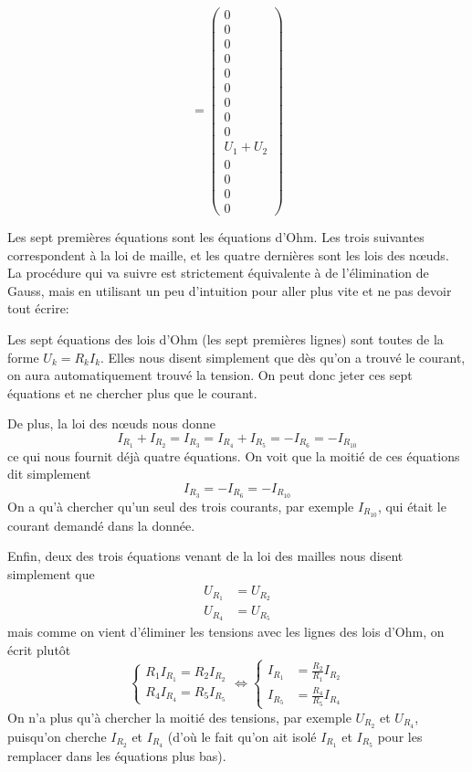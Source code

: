 \documentclass{article}
\begin{document}
\[=\begin{pmatrix}0\\0\\0\\0\\0\\0\\0\\0\\0\\U_1 + U_2\\0\\0\\0\\0\end{pmatrix}
\]

Les sept premières équations sont les équations d'Ohm. Les trois suivantes correspondent à la loi de maille, et les quatre dernières sont les lois des n\oe{}uds. La procédure qui va suivre est strictement équivalente à de l'élimination de Gauss, mais en utilisant un peu d'intuition pour aller plus vite et ne pas devoir tout écrire:

Les sept équations des lois d'Ohm (les sept premières lignes) sont toutes de la forme $U_k = R_k I_k$. Elles nous disent simplement que dès qu'on a trouvé le courant, on aura automatiquement trouvé la tension. On peut donc jeter ces sept équations et ne chercher plus que le courant.

De plus, la loi des n\oe{}uds nous donne
\[I_{R_1} + I_{R_2} = I_{R_3} = I_{R_4} + I_{R_5} = -I_{R_6} = -I_{R_{10}}\]
ce qui nous fournit déjà quatre équations. On voit que la moitié de ces équations dit simplement \[ I_{R_3}=-I_{R_6}=-I_{R_{10}}\] On a qu'à chercher qu'un seul des trois courants, par exemple $I_{R_{10}}$, qui était le courant demandé dans la donnée.

Enfin, deux des trois équations venant de la loi des mailles nous disent simplement que 
\begin{align*}
    U_{R_1}&=U_{R_2}\\
    U_{R_4}&=U_{R_5}
\end{align*}
mais comme on vient d'éliminer les tensions avec les lignes des lois d'Ohm, on écrit plutôt
\[
\left\{\begin{aligned}
    R_1I_{R_1}=R_2I_{R_2}\\
    R_4I_{R_4}=R_5I_{R_5}
\end{aligned}\right. \Leftrightarrow
\left\{\begin{aligned}
    I_{R_1} &= \frac{R_2}{R_1} I_{R_2}\\
    I_{R_5} &= \frac{R_4}{R_5} I_{R_4}
\end{aligned}\right.
\]
On n'a plus qu'à chercher la moitié des tensions, par exemple $U_{R_2}$ et $U_{R_4}$, puisqu'on cherche $I_{R_2}$ et $I_{R_4}$ (d'où le fait qu'on ait isolé $I_{R_1}$ et $I_{R_5}$ pour les remplacer dans les équations plus bas).
\end{document}

